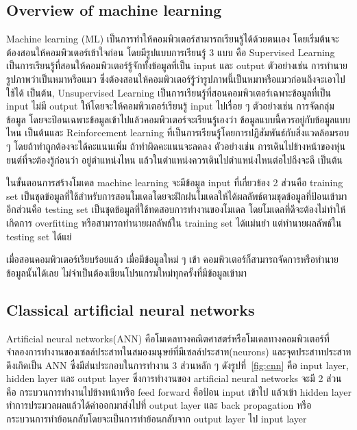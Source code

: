 \documentclass[12pt,oneside,openright,a4paper]{cpe-thai-project}
\begin{document}
\subsection{Overview of machine learning}
\par\setlength{\parindent}{5ex}Machine learning (ML) เป็นการทำให้คอมพิวเตอร์สามารถเรียนรู้ได้ด้วยตนเอง โดยเริ่มต้นจะต้องสอนให้คอมพิวเตอร์เข้าใจก่อน โดยมีรูปแบบการเรียนรู้ 3 แบบ คือ  Supervised Learning เป็นการเรียนรู้ที่สอนให้คอมพิวเตอร์รู้จักทั้งข้อมูลที่เป็น input และ output ตัวอย่างเช่น การทำนายรูปภาพว่าเป็นหมาหรือแมว ซึ่งต้องสอนให้คอมพิวเตอร์รู้ว่ารูปภาพนี้เป็นหมาหรือแมวก่อนถึงจะเอาไปใช้ได้ เป็นต้น, Unsupervised Learning เป็นการเรียนรู้ที่สอนคอมพิวเตอร์เฉพาะข้อมูลที่เป็น input ไม่มี output ให้โดยจะให้คอมพิวเตอร์เรียนรู้ input ไปเรื่อย ๆ ตัวอย่างเช่น การจัดกลุ่มข้อมูล โดยจะป้อนเฉพาะข้อมูลเข้าไปแล้วคอมพิวเตอร์จะเรียนรู้เองว่า ข้อมูลแบบนี้ควรอยู่กับข้อมูลแบบไหน เป็นต้นและ Reinforcement learning ที่เป็นการเรียนรู้โดยการปฏิสัมพันธ์กับสิ่งแวดล้อมรอบ ๆ โดยถ้าทำถูกต้องจะได้คะแนนเพิ่ม ถ้าทำผิดคะแนนจะลดลง ตัวอย่างเช่น การเดินไปข้างหน้าของหุ่นยนต์ที่จะต้องรู้ก่อนว่า อยู่ตำแหน่งไหน แล้วในตำแหน่งควรเดินไปตำแหน่งไหนต่อไปถึงจะดี เป็นต้น
\par\setlength{\parindent}{5ex}ในขั้นตอนการสร้างโมเดล machine learning จะมีข้อมูล input ที่เกี่ยวข้อง 2 ส่วนคือ training set เป็นชุดข้อมูลที่ใช้สำหรับการสอนโมเดลโดยจะฝึกฝนโมเดลให้ได้ผลลัพธ์ตามชุดข้อมูลที่ป้อนเข้ามา อีกส่วนคือ testing set เป็นชุดข้อมูลที่ใช้ทดสอบการทำงานของโมเดล โดยโมเดลที่ดีจะต้องไม่ทำให้เกิดการ overfitting หรือสามารถทำนายผลลัพธ์ใน training set ได้แม่นยำ แต่ทำนายผลลัพธ์ใน testing set ได้แย่ 
\par\setlength{\parindent}{5ex}เมื่อสอนคอมพิวเตอร์เรียบร้อยแล้ว เมื่อมีข้อมูลใหม่ ๆ เข้า คอมพิวเตอร์ก็สามารถจัดการหรือทำนายข้อมูลนั้นได้เลย ไม่จำเป็นต้องเขียนโปรแกรมใหม่ทุกครั้งที่มีข้อมูลเข้ามา

\subsection{Classical artificial neural networks}
\par\setlength{\parindent}{5ex}
Artificial neural networks(ANN) คือโมเดลทางคณิตศาสตร์หรือโมเดลทางคอมพิวเตอร์ที่จำลองการทำงานของเซลล์ประสาทในสมองมนุษย์ที่มีเซลล์ประสาท(neurons) และจุดประสาทประสาท  ดึงเกิดเป็น ANN ซึ่งมีส่นประกอบในการทำงาน 3 ส่วนหลัก ๆ ดังรูปที่~\ref{fig:cnn} คือ input layer, hidden layer และ output layer ซึ่งการทำงานของ artificial neural networks จะมี 2 ส่วนคือ กระบวนการทำงานไปข้างหน้าหรือ feed forward คือป้อน input เข้าไป แล้วเข้า hidden layer ทำการประมวลผลแล้วได้ค่าออกมาส่งไปที่ output layer และ back propagation หรือกระบวนการทำย้อนกลับโดยจะเป็นการทำย้อนกลับจาก output layer ไป input layer
\end{document}
